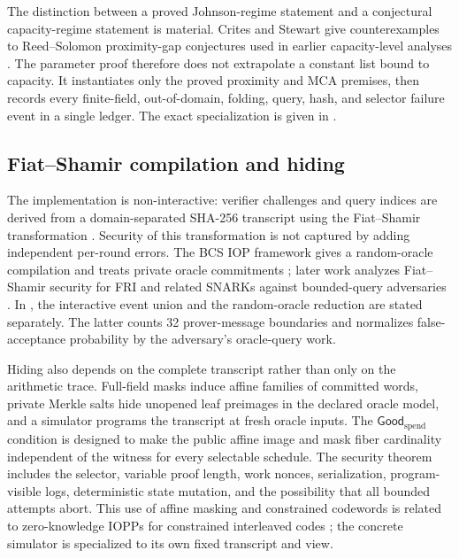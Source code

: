 The distinction between a proved Johnson-regime statement and a conjectural
capacity-regime statement is material.  Crites and Stewart give counterexamples
to Reed--Solomon proximity-gap conjectures used in earlier capacity-level
analyses \cite{CritesStewart2025}.  The \Profile{} parameter proof therefore does
not extrapolate a constant list bound to capacity.  It instantiates only the
proved proximity and MCA premises, then records every finite-field,
out-of-domain, folding, query, hash, and selector failure event in a single
ledger.  The exact specialization is given in
.

\subsection{Fiat--Shamir compilation and hiding}

The implementation is non-interactive: verifier challenges and query indices
are derived from a domain-separated SHA-256 transcript using the
Fiat--Shamir transformation \cite{FiatShamir1987}.  Security of this
transformation is not captured by adding independent per-round errors.  The
BCS IOP framework gives a random-oracle compilation and treats private oracle
commitments \cite{BenSassonChiesaSpooner2016}; later work analyzes Fiat--Shamir security
for FRI and related SNARKs against bounded-query adversaries
\cite{BlockGarretaKatzThalerTiwariZajac2023}.  In \Profile{}, the interactive event union and
the random-oracle reduction are stated separately.  The latter counts 32
prover-message boundaries and normalizes false-acceptance probability by the
adversary's oracle-query work.

Hiding also depends on the complete transcript rather than only on the
arithmetic trace.  Full-field masks induce affine families of committed words,
private Merkle salts hide unopened leaf preimages in the declared oracle
model, and a simulator programs the transcript at fresh oracle inputs.  The
\(\mathsf{Good}_{\mathrm{spend}}\) condition is designed to make the public affine image and mask
fiber cardinality independent of the witness for every selectable schedule.
The security theorem includes the selector, variable proof length, work
nonces, serialization, program-visible logs, deterministic state mutation,
and the possibility that all bounded attempts abort.  This use of affine
masking and constrained codewords is related to zero-knowledge IOPPs for
constrained interleaved codes \cite{ChiesaFenziWeissenberg2026}; the concrete
\Profile{} simulator is specialized to its own fixed transcript and view.

